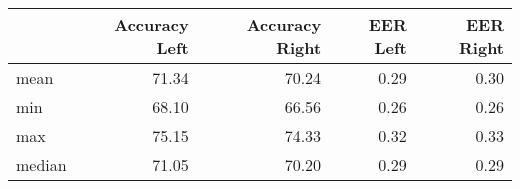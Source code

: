 \begin{tabular}{lrrrr}
\toprule
{} &  Accuracy Left &  Accuracy Right &  EER Left &  EER Right \\
\midrule
mean   &          71.34 &           70.24 &      0.29 &       0.30 \\
min    &          68.10 &           66.56 &      0.26 &       0.26 \\
max    &          75.15 &           74.33 &      0.32 &       0.33 \\
median &          71.05 &           70.20 &      0.29 &       0.29 \\
\bottomrule
\end{tabular}
